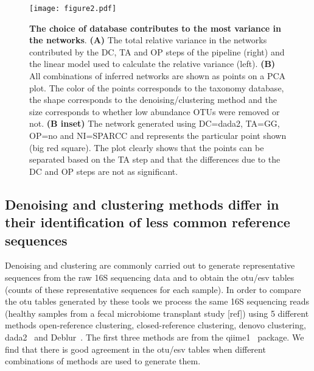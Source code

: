   \begin{figure}
    \centering
    \texttt{[image: figure2.pdf]}
    \caption{
      \textbf{The choice of database contributes to the most variance in the networks}.
      \textbf{(A)} The total relative variance in the networks contributed by the DC, TA and OP steps of the pipeline (right) and the linear model used to calculate the relative variance (left).
      \textbf{(B)} All combinations of inferred networks are shown as points on a PCA plot.
      The color of the points corresponds to the taxonomy database, the shape corresponds to the denoising/clustering method and the size corresponds to whether low abundance OTUs were removed or not.
      \textbf{(B inset)} The network generated using DC=dada2, TA=GG, OP=no and NI=SPARCC and represents the particular point shown (big red square).
      The plot clearly shows that the points can be separated based on the TA step and that the differences due to the DC and OP steps are not as significant.
    }
    \label{fig:figure2}
  \end{figure}

  \FloatBarrier

  \subsection*{Denoising and clustering methods differ in their identification of less common reference sequences}

  Denoising and clustering are commonly carried out to generate representative sequences from the raw 16S sequencing data and to obtain the \ac{otu}/\ac{esv} tables (counts of these representative sequences for each sample).
  In order to compare the \ac{otu} tables generated by these tools we process the same 16S sequencing reads (healthy samples from a fecal microbiome transplant study [ref]) using 5 different methods \- open-reference clustering, closed-reference clustering, denovo clustering, \ac{dada2}~\cite{Callahan2016} and Deblur~\cite{Amir2017}.
  The first three methods are from the \ac{qiime1}~\cite{Caporaso2010} package.
  We find that there is good agreement in the \ac{otu}/\ac{esv} tables when different combinations of methods are used to generate them.

